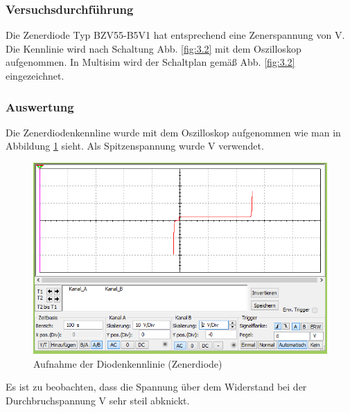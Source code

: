 \documentclass[12pt,a4paper]{article}
\begin{document}
\subsubsection{Versuchsdurchführung}
Die Zenerdiode Typ BZV55-B5V1 hat entsprechend eine Zenerspannung von \unit[5,1]{V}.
Die Kennlinie wird nach Schaltung Abb. \ref{fig:3.2} mit dem Oszilloskop aufgenommen. In Multisim wird der Schaltplan gemäß Abb. \ref{fig:3.2} eingezeichnet.
\subsubsection{Auswertung}
Die Zenerdiodenkennline wurde mit dem Oszilloskop aufgenommen wie man in Abbildung \ref{fig:3.2_Aufnahme_Diodenkennlinie} sieht. Als Spitzenspannung wurde \unit[30]{V} verwendet.
\begin{figure}[H] 
  \centering
    \includegraphics[trim = 0mm 0mm 0mm 0mm, clip, scale = 1]{3_2_kennlinie.PNG}
  	\caption[Aufnahme der Diodenkennlinie (Zenerdiode)]{Aufnahme der Diodenkennlinie (Zenerdiode)}
  \label{fig:3.2_Aufnahme_Diodenkennlinie}
\end{figure}
Es ist zu beobachten, dass die Spannung über dem Widerstand bei der Durchbruchspannung \unit[5,1]{V} sehr steil abknickt.
\end{document}
